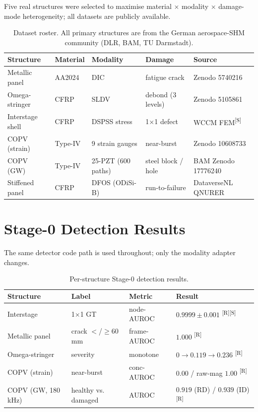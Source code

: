 \documentclass[10pt]{llncs}      %
\newcommand{\tagR}{\textsuperscript{[R]}}
\newcommand{\tagS}{\textsuperscript{[S]}}
\begin{document}
Five real structures were selected to maximise material $\times$ modality
$\times$ damage-mode heterogeneity; all datasets are publicly available.

\begin{table}[h]
  \caption{Dataset roster. All primary structures are from the German
           aerospace-SHM community (DLR, BAM, TU Darmstadt).}
  \label{tab:datasets}
  \small
  \centering
  \begin{tabular}{lllll}
    \toprule
    Structure & Material & Modality & Damage & Source \\
    \midrule
    Metallic panel & AA2024 & DIC & fatigue crack & Zenodo 5740216 \\
    Omega-stringer & CFRP & SLDV & debond (3 levels) & Zenodo 5105861 \\
    Interstage shell & CFRP & DSPSS stress & 1$\times$1 defect & WCCM FEM\tagS \\
    COPV (strain) & Type-IV & 9 strain gauges & near-burst & Zenodo 10608733 \\
    COPV (GW) & Type-IV & 25-PZT (600 paths) & steel block / hole & BAM Zenodo 17776240 \\
    Stiffened panel & CFRP & DFOS (ODiSi-B) & run-to-failure & DataverseNL QNURER \\
    \bottomrule
  \end{tabular}
\end{table}

\section{Stage-0 Detection Results}
\label{sec:detect}

The same detector code path is used throughout; only the modality adapter
changes.

\begin{table}[h]
  \caption{Per-structure Stage-0 detection results.}
  \label{tab:results}
  \small
  \centering
  \begin{tabular}{llll}
    \toprule
    Structure & Label & Metric & Result \\
    \midrule
    Interstage & 1$\times$1 GT & node-AUROC & $0.9999 \pm 0.001$ \tagR\tagS \\
    Metallic panel & crack $<$/$\geq$60\,mm & frame-AUROC & $1.000$ \tagR \\
    Omega-stringer & severity & monotone & $0\to0.119\to0.236$ \tagR \\
    COPV (strain) & near-burst & conc-AUROC & $0.00$ / raw-mag $1.00$ \tagR \\
    COPV (GW, 180\,kHz) & healthy vs. damaged & AUROC & $0.919$ (RD) / $0.939$ (ID) \tagR \\
    \bottomrule
  \end{tabular}
\end{table}
\end{document}
